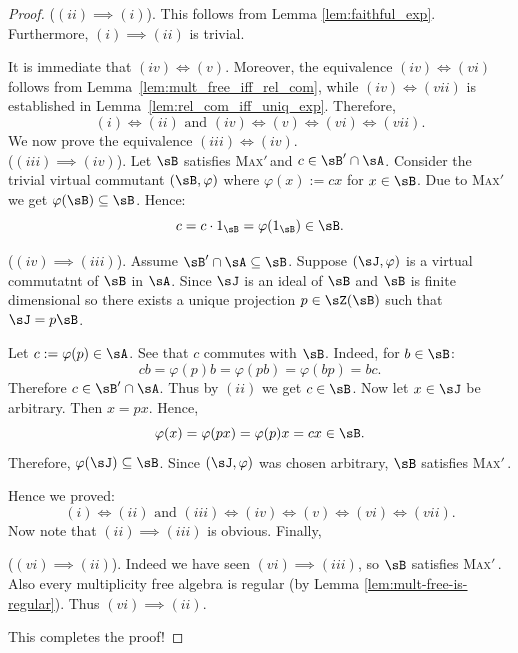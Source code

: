 \documentclass[12pt,a4paper]{amsart}
\theoremstyle{plain}
\theoremstyle{definition}
\theoremstyle{remark}
\numberwithin{equation}{section}
\theoremstyle{ser}
\theoremstyle{serr}
\theoremstyle{ser}
\theoremstyle{ser}
\theoremstyle{collabquestion}
\newcommand{\<}{\langle}
\renewcommand{\>}{\rangle}
\newcommand{\maxprime}{\textsc{Max}$'$\,}
\begin{document}
\begin{proof}

\noindent($(ii) \implies (i)$). This follows from Lemma \ref{lem:faithful_exp}. Furthermore, $(i) \implies (ii)$ is trivial.

    
    It is immediate that $(iv) \iff (v)$. Moreover, the equivalence $(iv) \iff (vi)$ follows from Lemma~\ref{lem:mult_free_iff_rel_com}, while $(iv) \iff (vii)$ is established in Lemma~\ref{lem:rel_com_iff_uniq_exp}. Therefore, 
    \[
    (i) \iff (ii)  \text{ and } (iv) \iff (v) \iff (vi) \iff (vii).
    \]
    We now prove the equivalence $(iii) \iff (iv)$.\\

    \noindent($(iii) \implies (iv)$). Let $\sB$ satisfies \maxprime and $c \in \sB'\cap \sA$. Consider the trivial virtual commutant $(\sB, \varphi)$ where $\varphi(x) := cx$ for $x \in \sB$. Due to \maxprime we get $\varphi(\sB) \subseteq \sB$. Hence:
    \[
    c = c \cdot 1_\sB = \varphi(1_\sB) \in \sB.
    \]

    \vspace{0.3cm}
    \noindent($(iv) \implies (iii)$). Assume $\sB'\cap \sA \subseteq \sB$. Suppose $(\sJ, \varphi)$ is a virtual commutatnt of $\sB$ in $\sA$. Since $\sJ$ is an ideal of $\sB$ and $\sB$ is finite dimensional so there exists a unique projection $p\in \sZ (\sB)$ such that $\sJ = p\sB$.

    Let $c:=\varphi(p)\in \sA$. See that $c$ commutes with $\sB$. Indeed, for $b\in \sB$:
    \[
    cb = \varphi(p) b = \varphi(pb) = \varphi(bp) = bc.
    \]
    Therefore $c\in \sB' \cap \sA$. Thus by $(ii)$ we get $c\in \sB$. Now let $x \in \sJ$ be arbitrary. Then $x = px$. Hence,
    \[
    \varphi(x) = \varphi(px) = \varphi(p) x = cx \in \sB.
    \]
    Therefore, $\varphi(\sJ) \subseteq \sB$. Since $(\sJ, \varphi)$ was chosen arbitrary, $\sB$ satisfies \maxprime.

    Hence we proved:
    \[
     (i) \iff (ii)  \text{ and } (iii) \iff (iv) \iff (v) \iff (vi) \iff (vii).
    \]
    Now note that $(ii) \implies (iii)$ is obvious. Finally,

    \vspace{0.3cm}
    \noindent($(vi) \implies (ii)$). Indeed we have seen $(vi)\implies (iii)$, so $\sB$ satisfies \maxprime. Also every multiplicity free algebra is regular (by Lemma \ref{lem:mult-free-is-regular}). Thus $(vi) \implies (ii)$.

    This completes the proof!
\end{proof}
\end{document}
